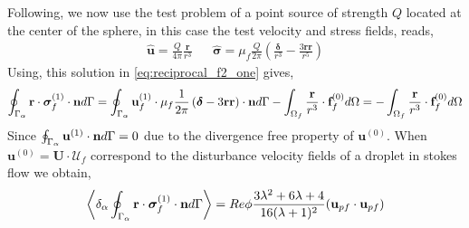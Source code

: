 Following, \citet{stone2001inertial} we now use the test problem of a point source of strength $Q$ located at the center of the sphere, in this case the test velocity  and stress fields, reads, 
\begin{align*}
    \hat{\textbf{u}} = \frac{Q}{4\pi} \frac{\textbf{r}}{r^3}
    && \hat{\bm\sigma} = \mu_f \frac{Q}{2\pi}\left(
        \frac{\bm\delta}{r^3}
        - \frac{3 \textbf{rr}}{r^5}
    \right)
\end{align*}
Using, this solution in \ref{eq:reciprocal_f2_one} gives, 
\begin{align*}
    \oint_{\Gamma_{\alpha}}  \textbf{r}\cdot  \bm\sigma_f^{(1)} \cdot \textbf{n} d\Gamma
    = 
    \oint_{\Gamma_{\alpha}} \textbf{u}_f^{(1)} \cdot  \mu_f \frac{1}{2\pi}\left(
        \bm\delta
        - 3 \textbf{rr}
    \right) \cdot \textbf{n} d\Gamma
    - \int_{\Omega_f}  \frac{\textbf{r}}{r^3}\cdot  \textbf{f}^{(0)}_f d\Omega
    = 
    - \int_{\Omega_f}  \frac{\textbf{r}}{r^3}\cdot  \textbf{f}^{(0)}_f d\Omega\\
\end{align*}
Since $\oint_{\Gamma_{\alpha}} \textbf{u}^{(1)} \cdot \textbf{n} d\Gamma =0$ due to the divergence free property of $\textbf{u}^{(0)}$. 
When $\textbf{u}^{(0)} = \textbf{U}\cdot \mathcal{U}_f$ correspond to the disturbance velocity fields of a droplet in stokes flow we obtain, 
\begin{equation*}
    \left<\delta_\alpha \oint_{\Gamma_{\alpha}}  \textbf{r}\cdot  \bm\sigma_f^{(1)} \cdot \textbf{n} d\Gamma\right>
    = Re \phi \frac{3\lambda^2 + 6\lambda + 4}{16(\lambda +1 )^2} (\textbf{u}_{pf}\cdot \textbf{u}_{pf})
\end{equation*}